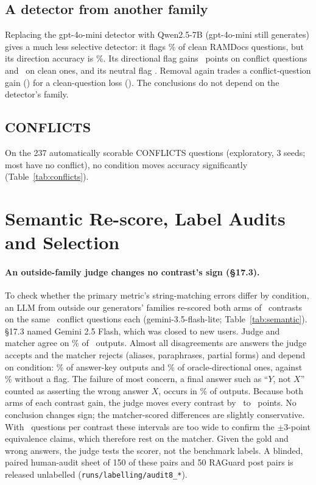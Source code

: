\subsection{A detector from another family}
Replacing the gpt-4o-mini detector with Qwen2.5-7B (gpt-4o-mini still generates) gives a much less selective
detector: it flags \qdetFpr\% of clean RAMDocs questions, but its direction accuracy is \qdetDir\%. Its directional
flag gains \zQDetLlmDirFlagDirectionalConflict\ points on conflict questions and \zQDetLlmDirFlagDirectionalClean\ on
clean ones, and its neutral flag \zQDetLlmDirFlagConflict. Removal again trades a conflict-question gain
(\zQDetLlmDirRemoveSuspectConflict) for a clean-question loss (\zQDetLlmDirRemoveSuspectClean). The conclusions do
not depend on the detector's family.

\subsection{CONFLICTS}
On the 237 automatically scorable CONFLICTS questions (exploratory, 3 seeds; most have no conflict), no condition
moves accuracy significantly (Table~\ref{tab:conflicts}).

\section{Semantic Re-score, Label Audits and Selection}
\label{app:semantic}

\paragraph{An outside-family judge changes no contrast's sign (\S17.3).} To
check whether the primary metric's string-matching errors differ by condition, an LLM from outside our generators' families re-scored both
arms of \semK\ contrasts on the same \semNq\ conflict questions each (gemini-3.5-flash-lite; Table~\ref{tab:semantic}).
\S17.3 named Gemini 2.5 Flash, which was closed to new users. Judge and matcher agree on \semAgree\% of \semN\ outputs. Almost all
disagreements are answers the judge accepts and the matcher rejects (aliases, paraphrases, partial forms) and
depend on condition: \semJudgeOnlyKey\% of answer-key outputs and \semJudgeOnlyDir\% of oracle-directional ones,
against \semJudgeOnlyPlain\% without a flag. The failure of most concern, a final answer such as
``$Y$, not $X$'' counted as asserting the wrong answer $X$, occurs in \semRejected\% of outputs. Because
both arms of each contrast gain, the judge moves every contrast by \semDidMin\ to \semDidMax\ points. No conclusion
changes sign; the matcher-scored differences are slightly conservative. With \semNq\ questions per contrast these
intervals are too wide to confirm the $\pm$3-point equivalence claims, which therefore rest on the matcher. Given
the gold and wrong answers, the judge tests the scorer, not the benchmark labels. A blinded, paired human-audit sheet of
150 of these pairs and 50 RAGuard post pairs is released unlabelled (\texttt{runs/labelling/audit8\_*}).

